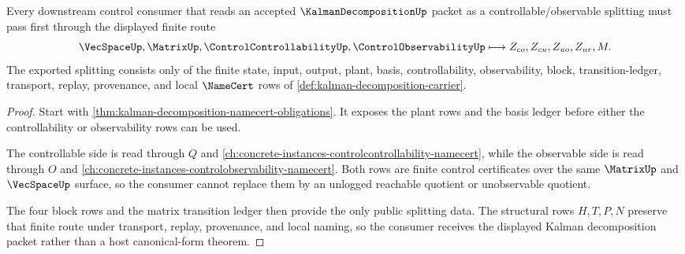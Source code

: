 \begin{theorem}
\label{thm:kalman-decomposition-controllable-observable-split}
Every downstream control consumer that reads an accepted $\KalmanDecompositionUp$ packet as a controllable/observable splitting must pass first through the displayed finite route
$$
\VecSpaceUp,\MatrixUp,\ControlControllabilityUp,\ControlObservabilityUp
\longmapsto
Z_{co},Z_{cu},Z_{uo},Z_{ur},M .
$$
The exported splitting consists only of the finite state, input, output, plant, basis, controllability, observability, block, transition-ledger, transport, replay, provenance, and local $\NameCert$ rows of \autoref{def:kalman-decomposition-carrier}.
\end{theorem}
\begin{proof}
Start with \autoref{thm:kalman-decomposition-namecert-obligations}. It exposes the plant rows and the basis ledger before either the controllability or observability rows can be used.

The controllable side is read through $Q$ and \autoref{ch:concrete-instances-controlcontrollability-namecert}, while the observable side is read through $O$ and \autoref{ch:concrete-instances-controlobservability-namecert}. Both rows are finite control certificates over the same $\MatrixUp$ and $\VecSpaceUp$ surface, so the consumer cannot replace them by an unlogged reachable quotient or unobservable quotient.

The four block rows and the matrix transition ledger then provide the only public splitting data. The structural rows $H,T,P,N$ preserve that finite route under transport, replay, provenance, and local naming, so the consumer receives the displayed Kalman decomposition packet rather than a host canonical-form theorem.
\end{proof}



